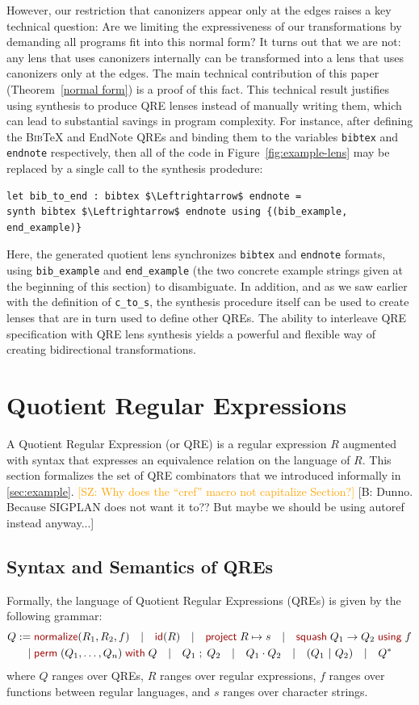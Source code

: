 \documentclass[acmsmall,review,anonymous]{acmart}
\newcommand{\FINISH}[3]{\ifdraft\textcolor{#1}{[#2: #3]}\fi}
\newcommand{\bcp}[1]{\FINISH{dkred}{B}{#1}}
\newcommand{\saz}[1]{\FINISH{orange}{SZ}{#1}}
\newcommand{\kw}[1]{\textcolor{dkred}{\ensuremath{\mathsf{#1}}}}
\newcommand{\project}[2]{\ensuremath{\kw{project} \; #1 \mapsto #2}}
\newcommand{\squash}[3]{\ensuremath{\kw{squash} \; #1 \rightarrow #2\; \kw{using} \; #3}}
\newcommand{\perm}[2]{\ensuremath{\kw{perm}\; (#1)\; \kw{with}\; #2}}
\newcommand{\normalize}[3]{\ensuremath{\kw{normalize}(#1, #2, #3)}}
\newcommand{\sep}{\ensuremath{\ | \ }}
\newcommand{\bibtex}{\textsc{Bib}\TeX{}}
\newcommand{\semicolon}{\ensuremath{\; ; \;}}
\newcommand{\id}{\ensuremath{\kw{id}}}
\newcommand{\cd}[1]{\lstinline[backgroundcolor=\color{white}]$#1$}
\begin{document}
However, our restriction that canonizers appear only at the edges
raises a key technical question: Are we limiting the expressiveness of
our transformations by demanding all programs fit into this normal
form?  It turns out that we are not: any lens that uses canonizers
internally can be transformed into a lens that uses canonizers only at
the edges. The main technical contribution of this paper
(Theorem~\ref{normal form})
is a proof of this fact.
This technical result justifies 
using synthesis to produce QRE lenses instead of manually writing
them,
which can lead to substantial savings in program complexity.
For instance, after defining the \bibtex{} and EndNote QREs and
binding them to the variables \cd{bibtex} and \cd{endnote} respectively, then
all of the code in Figure~\ref{fig:example-lens} may be replaced by a single call
to the synthesis prodedure:
\begin{lstlisting}
let bib_to_end : bibtex $\Leftrightarrow$ endnote =
synth bibtex $\Leftrightarrow$ endnote using {(bib_example, end_example)}
\end{lstlisting}
\noindent 
Here, the generated quotient lens synchronizes \cd{bibtex} and
\cd{endnote} formats, using \cd{bib_example} and \cd{end_example} (the two
concrete example strings given at the beginning of this section) to
disambiguate. In addition, and as we saw earlier with the definition of
\cd{c_to_s}, the synthesis procedure itself can be used to create lenses that
are in turn used to define other QREs.  The ability to interleave QRE
specification with QRE lens synthesis yields a powerful and flexible way of
creating bidirectional transformations.

\section{Quotient Regular Expressions}
\label{QRE}
A Quotient Regular Expression (or QRE) is a regular expression $R$ augmented
with syntax that expresses an equivalence relation on the language of $R$. This
section formalizes the set of QRE combinators that we introduced informally
in \cref{sec:example}.
\iflastminute 
\saz{Why does the ``cref'' macro not capitalize Section?}
\bcp{Dunno.  Because SIGPLAN does not want it to??  But maybe we should be
  using autoref instead anyway...}
\fi

\subsection{Syntax and Semantics of QREs}
Formally, the language of Quotient Regular Expressions (QREs) is given by the
following grammar:
\newcommand{\bsep}{\ \ \sep{} \ \ }
\begin{align*}
Q := \; & \normalize{R_1}{R_2}{f} \bsep{} \id(R) \bsep \project{R}{s} \bsep \squash{Q_1}{Q_2}{f} \\
 | \; & \perm{Q_1, \ldots, Q_n}{Q} \bsep Q_1 \semicolon Q_2 \bsep Q_1 \cdot Q_2 \bsep (Q_1
\sep Q_2) \bsep Q^*
\end{align*}
where $Q$ ranges over QREs, 
$R$ ranges over regular expressions, 
$f$ ranges over functions between regular languages, and 
$s$ ranges over character strings.
\end{document}
